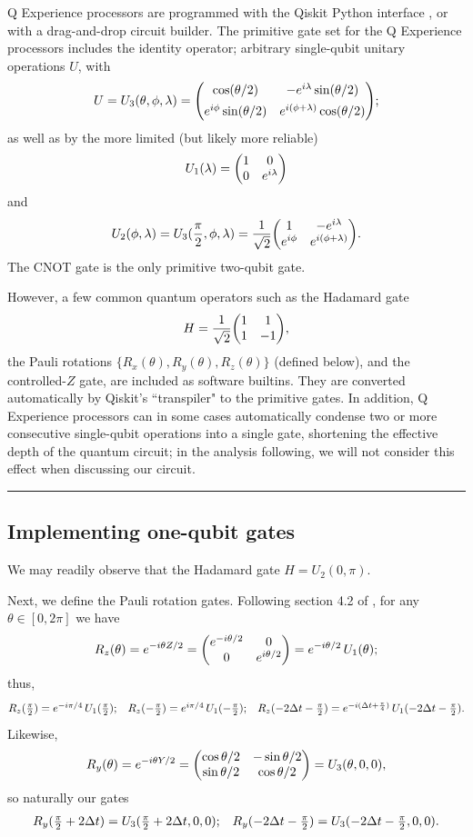 \documentclass[10pt]{amsart}
\theoremstyle{definition}
\newcommand\separator{\vspace{1em}\hrule \vspace{1em}}
\begin{document}
Q Experience processors are programmed with the Qiskit Python interface
\cite{Qiskit}, or with a drag-and-drop circuit builder. The primitive gate set
for the Q Experience processors includes the identity operator;  arbitrary
single-qubit unitary operations $U$, with
\[
  U = U_3(\theta,\phi,\lambda)
    = \mqty(\cos (\theta/2) & -e^{i\lambda} \sin (\theta/2) \\[4pt]
            e^{i\phi} \sin (\theta/2) & e^{i(\phi+\lambda)} \cos (\theta/2));
\]
as well as by the more limited (but likely more reliable)
\[ U_1(\lambda) = \mqty(1 & 0 \\ 0 & e^{i \lambda}) \]
and
\[
  U_2(\phi,\lambda) = U_3(\frac\pi2,\phi,\lambda) 
    = \frac{1}{\sqrt{2}} \mqty(1 & -e^{i\lambda} \\ 
                               e^{i\phi} & e^{i(\phi + \lambda)}).
\]
The CNOT gate is the only primitive two-qubit gate.

However, a few common quantum operators such as the Hadamard gate
\[ H = \frac{1}{\sqrt{2}} \mqty(1 & 1 \\ 1 & -1), \]
the Pauli rotations $\{R_x(\theta), R_y(\theta), R_z(\theta)\}$ (defined below),
and the controlled-$Z$ gate, are included as software builtins. They are
converted automatically by Qiskit's ``transpiler" to the primitive gates. In
addition, Q Experience processors can in some cases automatically condense two
or more consecutive single-qubit operations into a single gate, shortening the
effective depth of the quantum circuit; in the analysis following, we will not
consider this effect when discussing our circuit.

\separator


\subsection{Implementing one-qubit gates} \label{subsec:onequbit}

We may readily observe that the Hadamard gate $H = U_2(0,\pi)$.

Next, we define the Pauli rotation gates. Following section 4.2 of
\cite{NielsenChuang}, for any $\theta \in [0,2\pi]$ we have
\[
  R_z(\theta) = e^{-i\theta Z/2} = \mqty( e^{-i\theta/2} & 0 \\ 
                                          0 & e^{i\theta/2} )
              = e^{-i\theta/2}\, U_1(\theta);
\]
thus,
\[ \mqty{ 
  R_z(\frac\pi2) = e^{-i\pi/4}\, U_1(\frac\pi2); & 
  R_z(-\frac\pi2) = e^{i\pi/4}\, U_1(-\frac\pi2); & 
  R_z(-2\Delta t - \frac\pi2) = e^{-i(\Delta t + \frac\pi4)}\,
    U_1(-2\Delta t - \frac\pi2).
} \]
Likewise,
\[
  R_y(\theta) = e^{-i\theta Y/2} = \mqty( \cos \theta/2 & - \sin \theta/2 \\
                                          \sin \theta/2 & \cos \theta/2)
              = U_3(\theta,0,0),
\]
so naturally our gates
\[ \mqty{
  R_y(\frac\pi2 + 2\Delta t) = U_3(\frac\pi2 + 2\Delta t,0,0); &
  R_y(-2\Delta t - \frac\pi2) = U_3(-2\Delta t - \frac\pi2,0,0).
} \]
\end{document}
